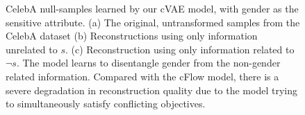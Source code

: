 \begin{figure}[tb]
{      CelebA null-samples learned by our \ac{cVAE} model, with gender as the sensitive attribute.
    (a) The original, untransformed samples from the CelebA dataset
    (b) Reconstructions using only information unrelated to $s$.
    (c) Reconstruction using only information related to $\neg s$.
    The model learns to disentangle gender from the non-gender related information. 
    Compared with the \ac{cFlow} model, there is a severe degradation in reconstruction quality due to
    the model trying to simultaneously satisfy conflicting objectives.
  }\label{fig:celeba_vae}
\end{figure}

